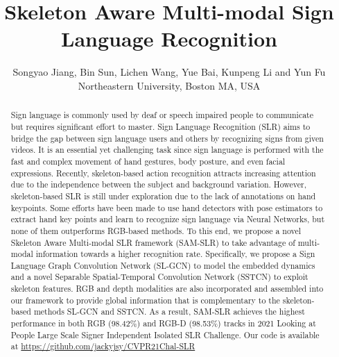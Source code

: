 \documentclass[final]{cvpr}
\begin{document}
\title{
Skeleton Aware Multi-modal Sign Language Recognition
}

\author{Songyao Jiang\textsuperscript{\textsection}, Bin Sun\textsuperscript{\textsection}, Lichen Wang, Yue Bai, Kunpeng Li and Yun Fu \\
Northeastern University, Boston MA, USA\\


}

\maketitle




\begingroup\renewcommand\thefootnote{\textsection}
\endgroup
\begingroup
\renewcommand\thefootnote{}
\endgroup

\begin{abstract}
Sign language is commonly used by deaf or speech impaired people to communicate but requires significant effort to master. Sign Language Recognition (SLR) aims to bridge the gap between sign language users and others by recognizing signs from given videos. It is an essential yet challenging task since sign language is performed with the fast and complex movement of hand gestures, body posture, and even facial expressions. 
Recently, skeleton-based action recognition attracts increasing attention due to the independence between the subject and background variation. 
However, skeleton-based SLR is still under exploration due to the lack of annotations on hand keypoints. Some efforts have been made to use hand detectors with pose estimators to extract hand key points and learn to recognize sign language via Neural Networks, but none of them outperforms RGB-based methods. 
To this end, we propose a novel Skeleton Aware Multi-modal SLR framework (SAM-SLR) to take advantage of multi-modal information towards a higher recognition rate. Specifically, we propose a Sign Language Graph Convolution Network (SL-GCN) to model the embedded dynamics and a novel Separable Spatial-Temporal Convolution Network (SSTCN) to exploit skeleton features. 
RGB and depth modalities are also incorporated and assembled into our framework to provide global information that is complementary to the skeleton-based methods SL-GCN and SSTCN. 
As a result, SAM-SLR achieves the highest performance in both RGB (98.42\%) and RGB-D (98.53\%) tracks in 2021 Looking at People Large Scale Signer Independent Isolated SLR Challenge. Our code is available at 
\url{https://github.com/jackyjsy/CVPR21Chal-SLR} \end{abstract}
\end{document}
